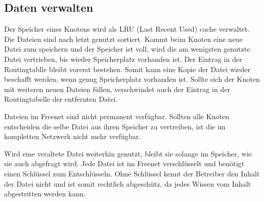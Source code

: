 \subsection{Daten verwalten}
Der Speicher eines Knotens wird als LRU (Last Recent Used) cache verwaltet.
Die Dateien sind nach letzt genutzt sortiert. Kommt beim Knoten eine neue Datei
zum speichern und der Speicher ist voll, wird die am wenigsten genutzte Datei
vertrieben, bis wieder Speicherplatz vorhanden ist. Der Eintrag in der
Routingtablle bleibt vorerst bestehen. Somit kann eine Kopie der Datei
wieder beschafft werden, wenn genug Speicherplatz vorhanden ist. Sollte sich
der Knoten mit weiteren neuen Dateien füllen, verschwindet auch der Eintrag
in der Routingtabelle der entfernten Datei.

Dateien im Freenet sind nicht permanent verfügbar. Sollten alle Knoten
entscheiden die selbe Datei aus ihren Speicher zu vertreiben, ist die im
kompletten Netzwerk nicht mehr verfügbar.

Wird eine veraltete Datei weiterhin genutzt, bleibt sie solange im Speicher,
wie sie auch abgefragt wird. Jede Datei ist im Freenet verschlüsselt und
benötigt einen Schlüssel zum Entschlüsseln.
Ohne Schlüssel kennt der Betreiber den Inhalt der Datei nicht und ist somit
rechtlich abgeschütz, da jedes Wissen vom Inhalt abgestritten werden kann.
